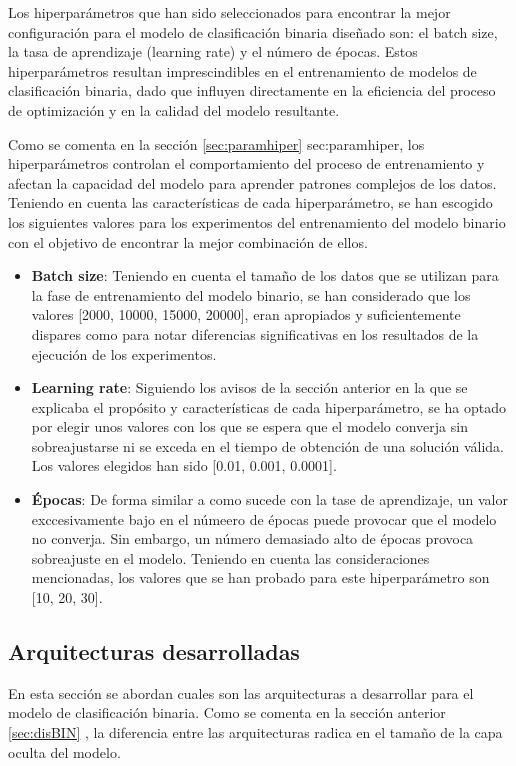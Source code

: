 Los hiperparámetros que han sido seleccionados para encontrar la mejor configuración para el modelo de clasificación binaria diseñado son: el batch size, la tasa de aprendizaje (learning rate) y el número de épocas. Estos hiperparámetros resultan imprescindibles en el entrenamiento de modelos de clasificación binaria, dado que influyen directamente en la eficiencia del proceso de optimización y en la calidad del modelo resultante.

Como se comenta en la sección \ref{sec:paramhiper} \refname{sec:paramhiper}, los hiperparámetros controlan el comportamiento del proceso de entrenamiento y afectan la capacidad del modelo para aprender patrones complejos de los datos. Teniendo en cuenta las características de cada hiperparámetro, se han escogido los siguientes valores para los experimentos del entrenamiento del modelo binario con el objetivo de encontrar la mejor combinación de ellos.

\begin{itemize}
	\item \textbf{Batch size}: Teniendo en cuenta el tamaño de los datos que se utilizan para la fase de entrenamiento del modelo binario, se han considerado que los valores [2000, 10000, 15000, 20000], eran apropiados y suficientemente dispares como para notar diferencias significativas en los resultados de la ejecución de los experimentos.
	\item \textbf{Learning rate}: Siguiendo los avisos de la sección anterior en la que se explicaba el propósito y características de cada hiperparámetro, se ha optado por elegir unos valores con los que se espera que el modelo converja sin sobreajustarse ni se exceda en el tiempo de obtención de una solución válida. Los valores elegidos han sido [0.01, 0.001, 0.0001].
	\item \textbf{Épocas}: De forma similar a como sucede con la tase de aprendizaje, un valor exccesivamente bajo en el númeero de épocas puede provocar que el modelo no converja. Sin embargo, un número demasiado alto de épocas provoca sobreajuste en el modelo. Teniendo en cuenta las consideraciones mencionadas, los valores que se han probado para este hiperparámetro son [10, 20, 30].
\end{itemize}

\subsection{Arquitecturas desarrolladas}
En esta sección se abordan cuales son las arquitecturas a desarrollar para el modelo de clasificación binaria. Como se comenta en la sección anterior \ref{sec:disBIN} , la diferencia entre las arquitecturas radica en el tamaño de la capa oculta del modelo.

